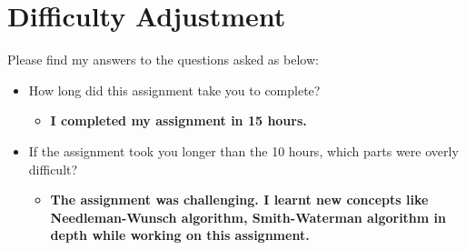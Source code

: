 \documentclass{article}
\begin{document}

\section{Difficulty Adjustment}
Please find my answers to the questions asked as below: 

\begin{itemize}
    \item  How long did this assignment take you to complete?
    \begin{itemize}
        \item \textbf{I completed my assignment in 15 hours.}
    \end{itemize}
    \item  If the assignment took you longer than the 10 hours, which parts were overly difficult?
    \begin{itemize}
        \item \textbf{The assignment was challenging. I learnt new concepts like Needleman-Wunsch
algorithm, Smith-Waterman algorithm in depth while working on this assignment. }
    \end{itemize}
\end{itemize}
\end{document}
